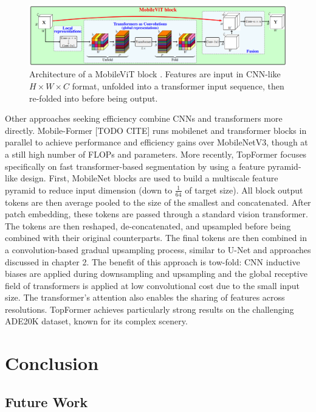 \documentclass[a4paper,12pt]{report}
\begin{document}
\begin{figure}[ht!]
    \centering
    \includegraphics[width=\textwidth]{res/mobilevit-block.png}
    \caption{Architecture of a MobileViT block \cite{mehta_mobilevit_2022}. Features are input in CNN-like $H \times W \times C$ format, unfolded into a transformer input sequence, then re-folded into before being output.}
    \label{fig:mobilevit_block}
\end{figure}

Other approaches seeking efficiency combine CNNs and transformers more directly. Mobile-Former [TODO CITE] runs mobilenet and transformer blocks in parallel to achieve performance and efficiency gains over MobileNetV3, though at a still high number of FLOPs and parameters. More recently, TopFormer \cite{zhang_topformer_2022} focuses specifically on fast transformer-based segmentation by using a feature pyramid-like design. First, MobileNet blocks are used to build a multiscale feature pyramid to reduce input dimension (down to $\frac{1}{64}$ of target size). All block output tokens are then average pooled to the size of the smallest and concatenated. After patch embedding, these tokens are passed through a standard vision transformer. The tokens are then reshaped, de-concatenated, and upsampled before being combined with their original counterparts. The final tokens are then combined in a convolution-based gradual upsampling process, similar to U-Net \cite{ronneberger_u-net_2015} and approaches discussed in chapter 2. The benefit of this approach is tow-fold: CNN inductive biases are applied during downsampling and upsampling and the global receptive field of transformers is applied at low convolutional cost due to the small input size. The transformer's attention also enables the sharing of features across resolutions. TopFormer achieves particularly strong results on the challenging ADE20K dataset, known for its complex scenery.



\FloatBarrier


\chapter{Conclusion}
\section{Future Work}


{}

\end{document}
